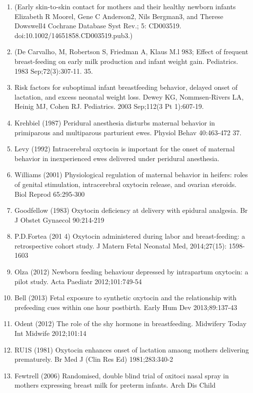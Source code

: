 \documentclass[]{article}
\begin{document}
\begin{enumerate}
\item
  (Early skin-to-skin contact for mothers and their healthy newborn
  infants Elizabeth R Moorel, Gene C Anderson2, Nils Bergman3, and
  Therese Dowswell4 Cochrane Database Syst Rev.; 5: CD003519.
  doi:10.1002/14651858.CD003519.pub3.)
\item
  (De Carvalho, M, Robertson S, Friedman A, Klaus M.l 983; Effect of
  frequent breast-feeding on early milk production and infant weight
  gain. Pediatrics. 1983 Sep;72(3):307-11. 35.
\item
  Risk factors for suboptimal infant breastfeeding behavior, delayed
  onset of lactation, and excess neonatal weight loss. Dewey KG,
  Nommsen-Rivers LA, Heinig MJ, Cohen RJ. Pediatrics. 2003 Sep;112(3 Pt
  1):607-19.
\item
  Krehbiel (1987) Peridural anesthesia disturbs maternal behavior in
  primiparous and multiparous parturient ewes. Physiol Behav 40:463-472
  37.
\item
  Levy (1992) Intracerebral oxytocin is important for the onset of
  maternal behavior in inexperienced ewes delivered under peridural
  anesthesia.
\item
  Williams (2001) Physiological regulation of maternal behavior in
  heifers: roles of genital stimulation, intracerebral oxytocin release,
  and ovarian steroids. Biol Reprod 65:295-300
\item
  Goodfellow (1983) Oxytocin deficiency at delivery with epidural
  analgesia. Br J Obstet Gynaecol 90:214-219
\item
  P.D.Fortea (201 4) Oxytocin administered during labor and
  breast-feeding: a retrospective cohort study. J Matern Fetal Neonatal
  Med, 2014;27(15): 1598-1603
\item
  Olza (2012) Newborn feeding behaviour depressed by intrapartum
  oxytocin: a pilot study. Acta Paediatr 2012;101:749-54
\item
  Bell (2013) Fetal exposure to synthetic oxytocin and the relationship
  with prefeeding cues within one hour postbirth. Early Hum Dev
  2013;89:137-43
\item
  Odent (2012) The role of the shy hormone in breastfeeding. Midwifery
  Today Int Midwife 2012;101:14
\item
  RU1S (1981) Oxytocin enhances onset of lactation amaong mothers
  delivering prematurely. Br Med J (Clin Res Ed) 1981;283:340-2
\item
  Fewtrell (2006) Randomised, double blind trial of oxitoci nasal spray
  in mothers expressing breast milk for preterm infants. Arch Dis Child

\end{enumerate}
\end{document}
